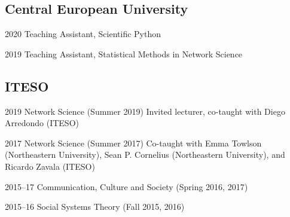 \documentclass{academiccv}
\begin{document}
\subsection*{Central European University}
\begin{tablist}
	\item[2020] \tab Teaching Assistant, Scientific Python
	\item[2019] \tab Teaching Assistant, Statistical Methods in Network Science
\end{tablist}

\subsection*{ITESO}
\begin{tablist}
	\item[2019] \tab Network Science (Summer 2019) Invited lecturer, co-taught with Diego Arredondo (ITESO)
	\item[2017]	\tab Network Science (Summer 2017) Co-taught with Emma Towlson (Northeastern University), Sean P. Cornelius (Northeastern University), and Ricardo Zavala (ITESO)
	\item [2015--17]\tab Communication, Culture and Society (Spring 2016, 2017)
	\item [2015--16]\tab Social Systems Theory (Fall 2015, 2016)
\end{tablist} 
\end{document}
